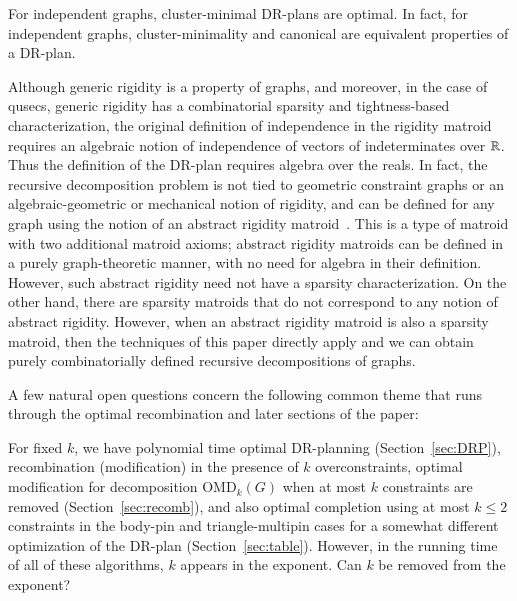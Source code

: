\begin{conjecture}
\label{conj:mfaisoptimal:rephrase}
    For independent graphs, cluster-minimal DR-plans are optimal. In fact, for independent graphs, cluster-minimality and canonical are equivalent properties of a DR-plan.
\end{conjecture}


\begin{openproblem}
\label{open:sparsitymatroid}
    Although generic rigidity is a property of graphs, and moreover,  in the case of qusecs, generic rigidity has a combinatorial sparsity and tightness-based characterization, the original definition of independence in the rigidity matroid requires an algebraic notion of independence of vectors of indeterminates over $\mathbb{R}$. Thus the definition of the DR-plan requires algebra over the reals.
    In fact, the recursive decomposition problem is not tied to geometric constraint graphs or an algebraic-geometric or mechanical notion of rigidity, and can be defined for any graph using the notion of an abstract rigidity matroid~\cite{graver93book}. This is a type of matroid with two additional matroid axioms; abstract rigidity matroids can be defined in a purely graph-theoretic manner,  with no need for algebra in their definition. However, such abstract rigidity need not have a sparsity characterization. On the other hand, there are sparsity matroids that do not correspond to any notion of abstract rigidity.
    However, when an abstract rigidity matroid is also a sparsity matroid, then the techniques of this paper directly apply and we can obtain purely combinatorially defined recursive decompositions of graphs.
\end{openproblem}


A few natural  open questions concern the following common theme that runs through the optimal recombination and later sections of the paper:

\begin{openproblem}
    For fixed $k$, we have
    polynomial time optimal DR-planning (Section~\ref{sec:DRP}),
    recombination (modification) in the presence of $k$ overconstraints,
    optimal modification for decomposition OMD$_k(G)$ when at most $k$ constraints are removed (Section~\ref{sec:recomb}),
    and also optimal completion using at most $k\le 2$ constraints in the body-pin and triangle-multipin cases for a somewhat different optimization of the DR-plan (Section~\ref{sec:table}).
    However, in the running time of all of these algorithms, $k$ appears in the exponent. Can $k$ be removed from the exponent?
\end{openproblem}

